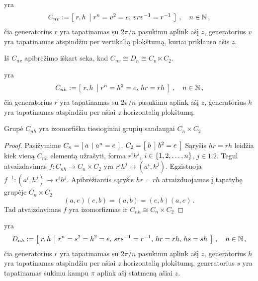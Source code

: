 \begin{definition}
	 yra 
	\begin{equation}
		C_{nv} := \left[\; r,h \;\left|\; r^n=v^2=e,\, vrv^{-1}=r^{-1} \;\right.\right]
		\,,\quad
		n \in \mathbb{N}
		\,,
	\end{equation}
	čia generatorius $r$ yra tapatinamas su $2\pi/n$ pasukimu aplink ašį $z$,
	generatorius $v$ yra tapatinamas atspindžiu per vertikalią plokštumą,
	kuriai priklauso ašis $z$.
\end{definition}

\begin{corollary}
	Iš $C_{nv}$ apibrėžimo iškart seka, kad $C_{nv} \cong D_n \cong C_n \ltimes C_2$. 
\end{corollary}

\begin{definition}
	 yra 
	\begin{equation}
		C_{nh} := \left[\; r,h \;\left|\; r^n=h^2=e,\, hr=rh \;\right.\right]
		\,,\quad
		n \in \mathbb{N}
		\,,
	\end{equation}
	čia generatorius $r$ yra tapatinamas su $2\pi/n$ pasukimu aplink ašį $z$,
	generatorius $h$ yra tapatinamas atspindžiu per ašiai $z$ horizontalią plokštumą.
\end{definition}

\begin{proposition}
	\label{prop:cnh_product}
	Grupė $C_{nh}$ yra izomorfiška tiesioginiai grupių sandaugai $C_n \times C_2$
\end{proposition}
\begin{proof}
	Pasižymime $C_n = \left[\; a \;\left|\; a^n=e \;\right.\right]$, $C_2 = \left[\; b \;\left|\; b^2=e \;\right.\right]$
	Sąryšis $hr=rh$ leidžia kiek vieną $C_{nh}$ elementą užrašyti,
	forma $r^i h^j$, $i\in \qty{1,2,\dots, n}$, $j\in \qty{1,2}$.
	Tegul atvaizdavimas $f: C_{nh} \to C_n \times C_2$ yra 
	$r^i h^j \mapsto (a^i,h^j)$.
	Egzistuoja $f^{-1}: (a^i,h^j) \mapsto r^i h^j$.
	Apibrėžiantis sąryšis $hr=rh$ atvaizduojamas į tapatybę grupėje $C_n \times C_2$
	\begin{equation}
		(a,e)(e,b) = (a,b) = (e,b)(a,e)
		\,.
	\end{equation}
	Tad atvaizdavimas $f$ yra izomorfizmas ir $C_{nh} \cong C_n \times C_2$
\end{proof}


\begin{definition}
	 yra 
	\begin{equation}
		D_{nh} := \left[\; r,h \;\left|\; 
			r^n=s^2=h^2=e,\,
			srs^{-1}=r^{-1},\,
			hr=rh,\,
			hs=sh
		 \;\right.\right]
		\,,\quad
		n \in \mathbb{N}
		\,,
	\end{equation}
	čia generatorius $r$ yra tapatinamas su $2\pi/n$ pasukimu aplink ašį $z$,
	generatorius $h$ yra tapatinamas atspindžiu per ašiai $z$ horizontalią plokštumą,
	generatorius $s$ yra tapatinamas sukimu kampu $\pi$ aplink ašį statmeną ašiai $z$.
\end{definition}

